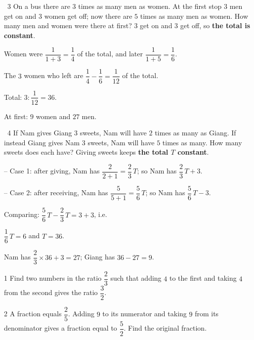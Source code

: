\gap
\begin{exbox}{\ExWord\ 3}
On a bus there are $3$ times as many men as women. At the first stop $3$ men get on and $3$ women get off; now there are $5$ times as many men as women. How many men and women were there at first?
\guide
$3$ get on and $3$ get off, so \textbf{the total is constant}.\par
Women were $\dfrac1{1+3}=\dfrac14$ of the total, and later $\dfrac1{1+5}=\dfrac16$.\par The $3$ women who left are $\dfrac14-\dfrac16=\dfrac1{12}$ of the total.\par
Total: $3:\dfrac1{12}=36$.\par At first: $9$ women and $27$ men.
\end{exbox}
\gap
\begin{exbox}{\ExWord\ 4}
If Nam gives Giang $3$ sweets, Nam will have $2$ times as many as Giang. If instead Giang gives Nam $3$ sweets, Nam will have $5$ times as many. How many sweets does each have?
\guide
Giving sweets keeps \textbf{the total $T$ constant}.\par
-- Case 1: after giving, Nam has $\dfrac2{2+1}=\dfrac23\,T$; so Nam has $\dfrac23\,T+3$.\par
-- Case 2: after receiving, Nam has $\dfrac5{5+1}=\dfrac56\,T$; so Nam has $\dfrac56\,T-3$.\par
Comparing: $\dfrac56\,T-\dfrac23\,T=3+3$, i.e.\par $\dfrac16\,T=6$ and $T=36$.\par
Nam has $\dfrac23\times36+3=27$; Giang has $36-27=9$.
\end{exbox}
\begin{probbox}{1}{\relax}
Find two numbers in the ratio $\dfrac23$ such that adding $4$ to the first and taking $4$ from the second gives the ratio $\dfrac32$.
\end{probbox}
\gap
\begin{probbox}{2}{\relax}
A fraction equals $\dfrac25$. Adding $9$ to its numerator and taking $9$ from its denominator gives a fraction equal to $\dfrac52$. Find the original fraction.
\end{probbox}
